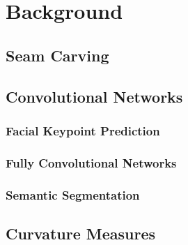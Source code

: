  
\chapter{Background} \label{sec:background}

\section{Seam Carving}

\section{Convolutional Networks}

\subsection{Facial Keypoint Prediction}

\subsection{Fully Convolutional Networks}

\subsection{Semantic Segmentation}

\section{Curvature Measures}
